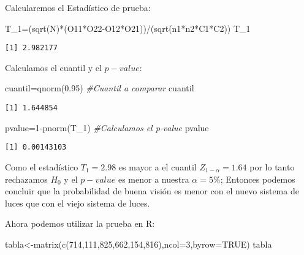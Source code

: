 \documentclass[
  a4paper,
  oneside,
  openany]{book}
\newenvironment{Shaded}{\begin{snugshade}}{\end{snugshade}}
\newcommand{\AttributeTok}[1]{\textcolor[rgb]{0.77,0.63,0.00}{#1}}
\newcommand{\CommentTok}[1]{\textcolor[rgb]{0.56,0.35,0.01}{\textit{#1}}}
\newcommand{\ConstantTok}[1]{\textcolor[rgb]{0.00,0.00,0.00}{#1}}
\newcommand{\DecValTok}[1]{\textcolor[rgb]{0.00,0.00,0.81}{#1}}
\newcommand{\FloatTok}[1]{\textcolor[rgb]{0.00,0.00,0.81}{#1}}
\newcommand{\FunctionTok}[1]{\textcolor[rgb]{0.00,0.00,0.00}{#1}}
\newcommand{\NormalTok}[1]{#1}
\newcommand{\OtherTok}[1]{\textcolor[rgb]{0.56,0.35,0.01}{#1}}
\newcommand{\SpecialCharTok}[1]{\textcolor[rgb]{0.00,0.00,0.00}{#1}}
\begin{document}
Calcularemos el Estadístico de prueba:

\begin{Shaded}
\begin{Highlighting}[]
\NormalTok{T\_1}\OtherTok{=}\NormalTok{(}\FunctionTok{sqrt}\NormalTok{(N)}\SpecialCharTok{*}\NormalTok{(O11}\SpecialCharTok{*}\NormalTok{O22}\SpecialCharTok{{-}}\NormalTok{O12}\SpecialCharTok{*}\NormalTok{O21))}\SpecialCharTok{/}\NormalTok{(}\FunctionTok{sqrt}\NormalTok{(n1}\SpecialCharTok{*}\NormalTok{n2}\SpecialCharTok{*}\NormalTok{C1}\SpecialCharTok{*}\NormalTok{C2))}
\NormalTok{T\_1}
\end{Highlighting}
\end{Shaded}

\begin{verbatim}
[1] 2.982177
\end{verbatim}

Calculamos el cuantil y el \(p-value\):

\begin{Shaded}
\begin{Highlighting}[]
\NormalTok{cuantil}\OtherTok{=}\FunctionTok{qnorm}\NormalTok{(}\FloatTok{0.95}\NormalTok{)  }\CommentTok{\#Cuantil a comparar}
\NormalTok{cuantil}
\end{Highlighting}
\end{Shaded}

\begin{verbatim}
[1] 1.644854
\end{verbatim}

\begin{Shaded}
\begin{Highlighting}[]
\NormalTok{pvalue}\OtherTok{=}\DecValTok{1}\SpecialCharTok{{-}}\FunctionTok{pnorm}\NormalTok{(T\_1)  }\CommentTok{\#Calculamos el p{-}value}
\NormalTok{pvalue}
\end{Highlighting}
\end{Shaded}

\begin{verbatim}
[1] 0.00143103
\end{verbatim}

Como el estadístico \(T_1=2.98\) es mayor a el cuantil \(Z_{1-\alpha}=1.64\) por lo tanto rechazamos \(H_0\)
y el \(p-value\) es menor a nuestra \(\alpha=5\%\); Entonces podemos concluir que la probabilidad de buena visión es menor con el nuevo sistema de luces que con el viejo sistema de luces.

Ahora podemos utilizar la prueba en R:

\begin{Shaded}
\begin{Highlighting}[]
\NormalTok{tabla}\OtherTok{\textless{}{-}}\FunctionTok{matrix}\NormalTok{(}\FunctionTok{c}\NormalTok{(}\DecValTok{714}\NormalTok{,}\DecValTok{111}\NormalTok{,}\DecValTok{825}\NormalTok{,}\DecValTok{662}\NormalTok{,}\DecValTok{154}\NormalTok{,}\DecValTok{816}\NormalTok{),}\AttributeTok{ncol=}\DecValTok{3}\NormalTok{,}\AttributeTok{byrow=}\ConstantTok{TRUE}\NormalTok{)}
\NormalTok{tabla}
\end{Highlighting}
\end{Shaded}
\end{document}
